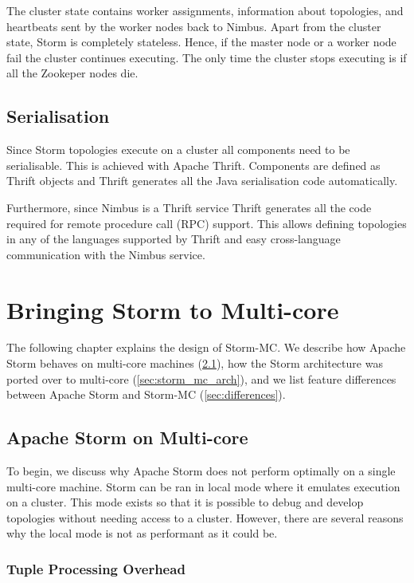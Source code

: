 \documentclass[bsc,logo,frontabs,twoside,singlespacing,normalheadings,parskip]{infthesis}\usepackage[]{graphicx}\usepackage[]{color}
\begin{document}
The cluster state contains worker assignments, information about topologies, and heartbeats sent by the worker nodes back to Nimbus. Apart from the cluster state, Storm is completely stateless. Hence, if the master node or a worker node fail the cluster continues executing. The only time the cluster stops executing is if all the Zookeper nodes die.

\section{Serialisation}
\label{sec:serialisation}

Since Storm topologies execute on a cluster all components need to be serialisable. This is achieved with Apache Thrift. Components are defined as Thrift objects and Thrift generates all the Java serialisation code automatically.

Furthermore, since Nimbus is a Thrift service Thrift generates all the code required for remote procedure call (RPC) support. This allows defining topologies in any of the languages supported by Thrift and easy cross-language communication with the Nimbus service.
\clearpage{}

\clearpage{}\chapter{Bringing Storm to Multi-core}

The following chapter explains the design of Storm-MC. We describe how Apache Storm behaves on multi-core machines (\ref{sec:storm_on_mc}), how the Storm architecture was ported over to multi-core (\ref{sec:storm_mc_arch}), and we list feature differences between Apache Storm and Storm-MC (\ref{sec:differences}).

\section{Apache Storm on Multi-core}
\label{sec:storm_on_mc}

To begin, we discuss why Apache Storm does not perform optimally on a single multi-core machine. Storm can be ran in local mode where it emulates execution on a cluster. This mode exists so that it is possible to debug and develop topologies without needing access to a cluster. However, there are several reasons why the local mode is not as performant as it could be.

\subsection{Tuple Processing Overhead}
\end{document}

